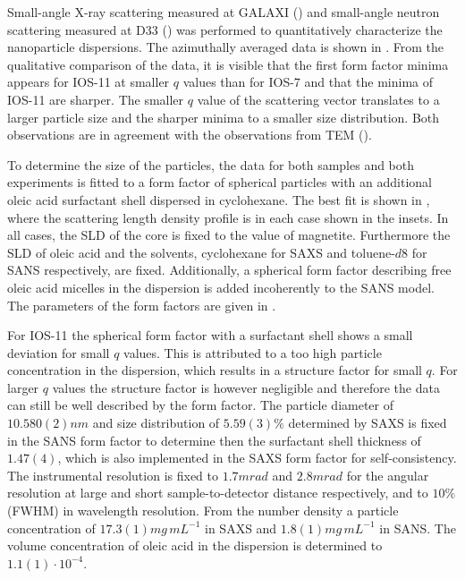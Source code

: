 \documentclass[\main/dresen_thesis.tex]{subfiles}
\begin{document}
  \label{sec:looselyPackedNS:nanoparticle:sas}
  Small-angle X-ray scattering measured at GALAXI () and small-angle neutron scattering measured at D33 () was performed to quantitatively characterize the nanoparticle dispersions.
  The azimuthally averaged data is shown in .
  From the qualitative comparison of the data, it is visible that the first form factor minima appears for IOS-11 at smaller $q$ values than for IOS-7 and that the minima of IOS-11 are sharper.
  The smaller $q$ value of the scattering vector translates to a larger particle size and the sharper minima to a smaller size distribution.
  Both observations are in agreement with the observations from TEM ().


    To determine the size of the particles, the data for both samples and both experiments is fitted to a form factor of spherical particles with an additional oleic acid surfactant shell dispersed in cyclohexane.
    The best fit is shown in , where the scattering length density profile is in each case shown in the insets.
    In all cases, the SLD of the core is fixed to the value of magnetite.
    Furthermore the SLD of oleic acid and the solvents, cyclohexane for SAXS and toluene-$\mathit{d8}$ for SANS respectively, are fixed.
    Additionally, a spherical form factor describing free oleic acid micelles in the dispersion is added incoherently to the SANS model.
    The parameters of the form factors are given in .

    For IOS-11 the spherical form factor with a surfactant shell shows a small deviation for small $q$ values.
    This is attributed to a too high particle concentration in the dispersion, which results in a structure factor for small $q$.
    For larger $q$ values the structure factor is however negligible and therefore the data can still be well described by the form factor.
    The particle diameter of $10.580(2) \unit{nm}$ and size distribution of $5.59(3) \%$ determined by SAXS is fixed in the SANS form factor to determine then the surfactant shell thickness of $1.47(4)$, which is also implemented in the SAXS form factor for self-consistency.
    The instrumental resolution is fixed to $1.7 \unit{mrad}$ and $2.8 \unit{mrad}$ for the angular resolution at large and short sample-to-detector distance respectively, and to $10 \%$ (FWHM) in wavelength resolution.
    From the number density a particle concentration of $17.3(1) \unit{mg \, mL^{-1}}$ in SAXS and $1.8(1) \unit{mg \, mL^{-1}}$ in SANS.
    The volume concentration of oleic acid in the dispersion is determined to $1.1(1) \cdot 10^{-4}$.
\end{document}

